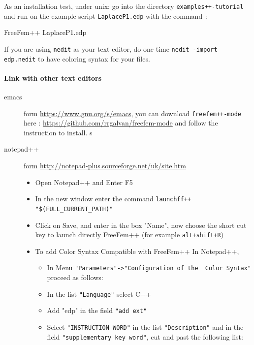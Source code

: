 \documentclass[a4paper,twoside,12pt]{book}
\begin{document}
As an installation test, under unix:  go into the directory
\texttt{examples++-tutorial} and run \freefempp on the example script
\texttt{LaplaceP1.edp} with the command~:

\bFF
FreeFem++ LaplaceP1.edp
\eFF

If you are using \texttt{nedit} as your text editor,
do one time \verb!nedit -import edp.nedit! to have coloring syntax for your 
files.


\paragraph{Link with other text editors}
\begin{description}
\item[{emacs}]  form \url{https://www.gnu.org/s/emacs}, you can download \texttt{freefem++-mode} here :
\url{https://github.com/rrgalvan/freefem-mode} and follow the instruction to install. s



\item[{notepad++}] form \url{http://notepad-plus.sourceforge.net/uk/site.htm}


\begin{itemize}

\item  Open Notepad++ and Enter  F5
\item   In the new window  enter  the command
\verb!launchff++ "$(FULL_CURRENT_PATH)"!
\item Click on  Save,  and enter  \freefempp in the box  "Name", now  choose
the  short cut key  to launch directly FreeFem++  (for example \texttt{alt+shift+R})
 \item To add    Color Syntax Compatible with FreeFem++ In Notepad++,
 \begin{itemize}
\item In  Menu \verb!"Parameters"->"Configuration of the  Color Syntax"! proceed as follows:
\item In the list \verb!"Language"! select C++
\item Add "edp" in the  field  \verb!"add ext"!
\item Select  \verb!"INSTRUCTION WORD"! in the  list \verb!"Description"! and in the field
\verb!"supplementary key word"!, cut and past the following list:



\end{itemize}
\end{itemize}
\end{description}
\end{document}
